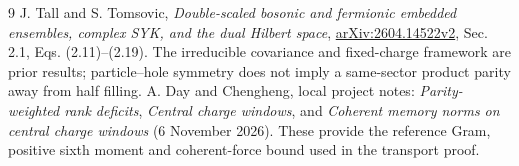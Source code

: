 \documentclass[11pt,a4paper]{article}
\begin{document}
\begin{thebibliography}{9}
 J. Tall and S. Tomsovic,
\emph{Double-scaled bosonic and fermionic embedded ensembles,
complex SYK, and the dual Hilbert space},
\href{https://arxiv.org/html/2604.14522v2}{arXiv:2604.14522v2},
Sec. 2.1, Eqs. (2.11)--(2.19). The irreducible covariance and
fixed-charge framework are prior results; particle--hole symmetry
does not imply a same-sector product parity away from half filling.
 A. Day and Chengheng, local project notes:
\emph{Parity-weighted rank deficits},
\emph{Central charge windows}, and
\emph{Coherent memory norms on central charge windows}
(6 November 2026). These provide the reference Gram, positive
sixth moment and coherent-force bound used in the transport proof.
\end{thebibliography}
\end{document}
